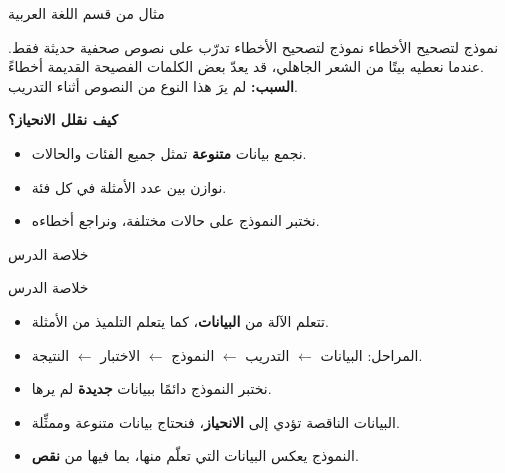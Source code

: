 \documentclass[aspectratio=169, 11pt, xcolor={table}]{beamer}
\begin{document}
\begin{frame}{مثال من قسم اللغة العربية}
    \small
    \begin{tbox}{\faChalkboardTeacher\quad نموذج لتصحيح الأخطاء}
        نموذج لتصحيح الأخطاء تدرّب على نصوص صحفية حديثة فقط.
        عندما نعطيه بيتًا من الشعر الجاهلي، قد يعدّ بعض الكلمات الفصيحة القديمة أخطاءً.\\[3pt]
        \textbf{السبب:} لم يرَ هذا النوع من النصوص أثناء التدريب.
    \end{tbox}
    \textbf{\color{tealDeep}كيف نقلل الانحياز؟}
    \begin{itemize}
        \item نجمع بيانات \textbf{متنوعة} تمثل جميع الفئات والحالات.
        \item نوازن بين عدد الأمثلة في كل فئة.
        \item نختبر النموذج على حالات مختلفة، ونراجع أخطاءه.
    \end{itemize}
\end{frame}

\begin{frame}{خلاصة الدرس}
    \begin{tbox}{\faCheckCircle\quad خلاصة الدرس}
        \begin{itemize}
            \item تتعلم الآلة من \textbf{البيانات}، كما يتعلم التلميذ من الأمثلة.
            \item المراحل: البيانات $\leftarrow$ التدريب $\leftarrow$ النموذج
                  $\leftarrow$ الاختبار $\leftarrow$ النتيجة.
            \item نختبر النموذج دائمًا ببيانات \textbf{جديدة} لم يرها.
            \item البيانات الناقصة تؤدي إلى \textbf{الانحياز}، فنحتاج بيانات متنوعة وممثِّلة.
            \item النموذج يعكس البيانات التي تعلّم منها، بما فيها من \textbf{نقص}.
        \end{itemize}
    \end{tbox}
\end{frame}
\end{document}
